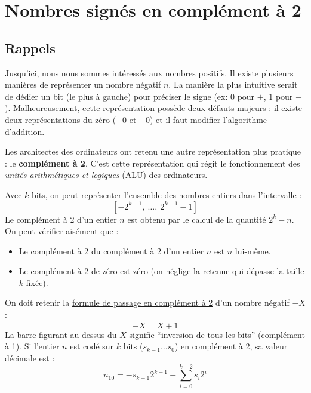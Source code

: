 \documentclass[a4paper,11pt]{article}
\begin{document}
\section{Nombres signés en complément à 2}
\subsection*{Rappels}
Jusqu'ici, nous nous sommes intéressés aux nombres positifs. Il existe plusieurs manières de représenter un nombre négatif $n$. La manière la plus intuitive serait de dédier un bit (le plus à gauche) pour préciser le signe (ex: $0$ pour $+$, $1$ pour $-$). Malheureusement, cette représentation possède deux défauts majeurs : il existe deux représentations du zéro ($+0$ et $-0$) et il faut modifier l'algorithme d'addition.

Les architectes des ordinateurs ont retenu une autre représentation plus pratique : le \textbf{complément à 2}. C'est cette représentation qui régit le fonctionnement des \textit{unités arithmétiques et logiques} (ALU) des ordinateurs.

Avec $k$ bits, on peut représenter l'ensemble des nombres entiers dans l'intervalle :
$$ [-2^{k-1},\ \dots,\ 2^{k-1}-1] $$
Le complément à 2 d'un entier $n$ est obtenu par le calcul de la quantité $2^k - n$. On peut vérifier aisément que :
\begin{itemize}
    \item Le complément à 2 du complément à 2 d'un entier $n$ est $n$ lui-même.
    \item Le complément à 2 de zéro est zéro (on néglige la retenue qui dépasse la taille $k$ fixée).
\end{itemize}

On doit retenir la \underline{formule de passage en complément à 2} d'un nombre négatif $-X$ :
\begin{equation}
    -X = \overline{X} + 1
\end{equation}
La barre figurant au-dessus du $X$ signifie ``inversion de tous les bits'' (complément à 1). Si l'entier $n$ est codé sur $k$ bits ($s_{k-1}\dots s_0$) en complément à 2, sa valeur décimale est :
\begin{equation}
    n_{10} = -s_{k-1}2^{k-1} + \sum_{i=0}^{k-2} s_i2^i
\end{equation}
\end{document}
